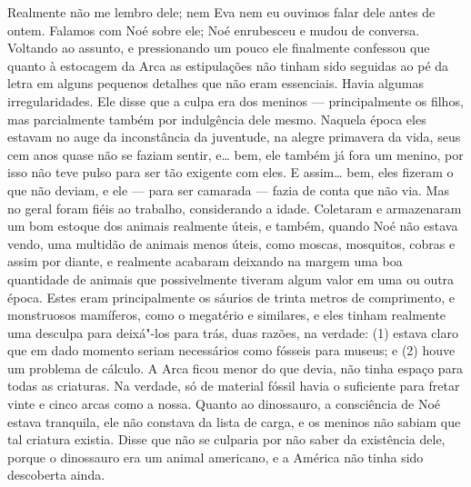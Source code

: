 Realmente não me lembro dele; nem Eva nem eu ouvimos falar dele antes de ontem.
Falamos com Noé sobre ele; Noé enrubesceu e mudou de conversa. Voltando ao
assunto, e pressionando um pouco ele finalmente confessou que quanto à
estocagem da Arca as estipulações não tinham sido seguidas ao pé da letra em alguns
pequenos detalhes que não eram essenciais. Havia algumas irregularidades. Ele disse
que a culpa era dos meninos --- principalmente os filhos, mas parcialmente também
por indulgência dele mesmo. Naquela época eles estavam no auge da inconstância da
juventude, na alegre primavera da vida, seus cem anos quase não se faziam
sentir, e\ldots{} bem, ele também já fora um menino, por isso não teve pulso para ser
tão exigente com eles. E assim\ldots{} bem, eles fizeram o que não deviam,
e ele --- para ser camarada --- fazia de conta que não via. Mas no geral foram
fiéis ao trabalho, considerando a idade. Coletaram e armazenaram um bom
estoque dos animais realmente úteis, e também, quando Noé não estava vendo, uma
multidão de animais menos úteis, como moscas, mosquitos, cobras e assim por
diante, e realmente acabaram deixando na margem uma boa quantidade de animais que
possivelmente tiveram algum valor em uma ou outra época. Estes
eram principalmente os sáurios de trinta metros de comprimento, e monstruosos
mamíferos, como o megatério e similares, e eles tinham realmente uma desculpa para
deixá"-los para trás, duas razões, na verdade: (1) estava claro que em dado momento
seriam necessários como fósseis para museus; e (2) houve um problema de cálculo. A
Arca ficou menor do que devia, não tinha espaço para todas as
criaturas. Na verdade, só de material fóssil havia o suficiente para fretar vinte e cinco
arcas como a nossa. Quanto ao dinossauro, a consciência de Noé estava tranquila,
ele não constava da lista de carga, e os meninos não sabiam que
tal criatura existia. Disse que não se culparia por não saber da existência dele,
porque o dinossauro era um animal americano, e a América não tinha sido descoberta
ainda.

